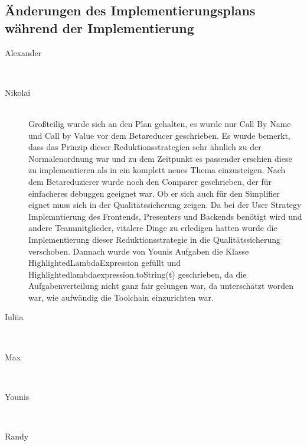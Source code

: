\documentclass[parskip=full,11pt,twoside]{scrartcl}
\begin{document}
\subsection{Änderungen des Implementierungsplans während der Implementierung}

\begin{description}

\item [Alexander]\hfill \\
\item [Nikolai]\hfill \\
Großteilig wurde sich an den Plan gehalten, es wurde nur Call By Name und Call by Value vor dem Betareducer geschrieben.
Es wurde  bemerkt, dass das Prinzip dieser Reduktionsstrategien sehr ähnlich zu der Normalenordnung war und zu dem Zeitpunkt es passender erschien diese zu implementieren als in ein komplett neues Thema einzusteigen.
Nach dem Betareduzierer wurde noch den Comparer geschrieben, der für einfacheres debuggen geeignet war. Ob er sich auch für den Simplifier eignet muss sich in der Qualitätssicherung zeigen.
Da bei der User Strategy Implemntierung des Frontends, Presenters und Backends benötigt wird und andere Teammitglieder, vitalere Dinge zu erledigen hatten
wurde die Implementierung dieser Reduktionsstrategie in die Qualitätssicherung verschoben.
Dannach wurde von Younis Aufgaben die Klasse HighlightedLambdaExpression gefüllt und  Highlightedlambdaexpression.toString(t) geschrieben, da die Aufgabenverteilung nicht ganz fair gelungen war, da unterschätzt worden war, wie aufwändig die Toolchain einzurichten war.

\item [Iuliia]\hfill \\
\item [Max]\hfill \\
\item [Younis]\hfill \\
\item [Randy]\hfill \\
\end{description}
\end{document}
